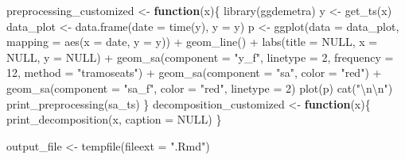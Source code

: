 \documentclass[
]{article}
\newenvironment{Shaded}{\begin{snugshade}}{\end{snugshade}}
\newcommand{\AttributeTok}[1]{\textcolor[rgb]{0.77,0.63,0.00}{#1}}
\newcommand{\ConstantTok}[1]{\textcolor[rgb]{0.00,0.00,0.00}{#1}}
\newcommand{\ControlFlowTok}[1]{\textcolor[rgb]{0.13,0.29,0.53}{\textbf{#1}}}
\newcommand{\DecValTok}[1]{\textcolor[rgb]{0.00,0.00,0.81}{#1}}
\newcommand{\FunctionTok}[1]{\textcolor[rgb]{0.00,0.00,0.00}{#1}}
\newcommand{\NormalTok}[1]{#1}
\newcommand{\OtherTok}[1]{\textcolor[rgb]{0.56,0.35,0.01}{#1}}
\newcommand{\SpecialCharTok}[1]{\textcolor[rgb]{0.00,0.00,0.00}{#1}}
\newcommand{\StringTok}[1]{\textcolor[rgb]{0.31,0.60,0.02}{#1}}
\begin{document}
\begin{Shaded}
\begin{Highlighting}[]
\NormalTok{preprocessing\_customized }\OtherTok{\textless{}{-}} \ControlFlowTok{function}\NormalTok{(x)\{}
  \FunctionTok{library}\NormalTok{(ggdemetra)}
\NormalTok{  y }\OtherTok{\textless{}{-}} \FunctionTok{get\_ts}\NormalTok{(x)}
\NormalTok{  data\_plot }\OtherTok{\textless{}{-}} \FunctionTok{data.frame}\NormalTok{(}\AttributeTok{date =} \FunctionTok{time}\NormalTok{(y), }\AttributeTok{y =}\NormalTok{ y)}
\NormalTok{  p }\OtherTok{\textless{}{-}} \FunctionTok{ggplot}\NormalTok{(}\AttributeTok{data =}\NormalTok{ data\_plot, }\AttributeTok{mapping =} \FunctionTok{aes}\NormalTok{(}\AttributeTok{x =}\NormalTok{ date, }\AttributeTok{y =}\NormalTok{ y)) }\SpecialCharTok{+}
    \FunctionTok{geom\_line}\NormalTok{() }\SpecialCharTok{+}
    \FunctionTok{labs}\NormalTok{(}\AttributeTok{title =} \ConstantTok{NULL}\NormalTok{,}
         \AttributeTok{x =} \ConstantTok{NULL}\NormalTok{, }\AttributeTok{y =} \ConstantTok{NULL}\NormalTok{) }\SpecialCharTok{+}
    \FunctionTok{geom\_sa}\NormalTok{(}\AttributeTok{component =} \StringTok{"y\_f"}\NormalTok{, }\AttributeTok{linetype =} \DecValTok{2}\NormalTok{,}
            \AttributeTok{frequency =} \DecValTok{12}\NormalTok{, }\AttributeTok{method =} \StringTok{"tramoseats"}\NormalTok{) }\SpecialCharTok{+}
    \FunctionTok{geom\_sa}\NormalTok{(}\AttributeTok{component =} \StringTok{"sa"}\NormalTok{, }\AttributeTok{color =} \StringTok{"red"}\NormalTok{) }\SpecialCharTok{+}
    \FunctionTok{geom\_sa}\NormalTok{(}\AttributeTok{component =} \StringTok{"sa\_f"}\NormalTok{, }\AttributeTok{color =} \StringTok{"red"}\NormalTok{, }\AttributeTok{linetype =} \DecValTok{2}\NormalTok{)}
  \FunctionTok{plot}\NormalTok{(p)}
  \FunctionTok{cat}\NormalTok{(}\StringTok{"}\SpecialCharTok{\textbackslash{}n\textbackslash{}n}\StringTok{"}\NormalTok{)}
  \FunctionTok{print\_preprocessing}\NormalTok{(sa\_ts)}
\NormalTok{\}}
\NormalTok{decomposition\_customized }\OtherTok{\textless{}{-}} \ControlFlowTok{function}\NormalTok{(x)\{}
  \FunctionTok{print\_decomposition}\NormalTok{(x, }\AttributeTok{caption =} \ConstantTok{NULL}\NormalTok{)}
\NormalTok{\}}

\NormalTok{output\_file }\OtherTok{\textless{}{-}} \FunctionTok{tempfile}\NormalTok{(}\AttributeTok{fileext =} \StringTok{".Rmd"}\NormalTok{)}


\end{Highlighting}
\end{Shaded}
\end{document}
